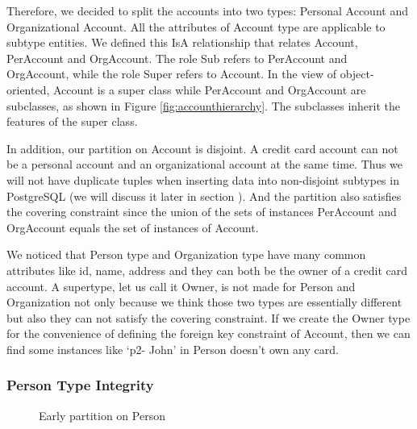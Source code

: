 \documentclass[11pt]{article}
\begin{document}
\par
Therefore, we decided to split the accounts into two types: Personal Account and Organizational Account. All the attributes of Account type are applicable to subtype entities. We defined this IsA relationship that relates Account, PerAccount and OrgAccount. The role Sub refers to PerAccount and OrgAccount, while the role Super refers to Account. In the view of object-oriented, Account is a super class while PerAccount and OrgAccount are subclasses, as shown in Figure \ref{fig:accounthierarchy}. The subclasses inherit the features of the super class.
\par
In addition, our partition on Account is disjoint. A credit card account can not be a personal account and an organizational account at the same time. Thus we will not have duplicate tuples when inserting data into non-disjoint subtypes in PostgreSQL (we will discuss it later in section \label{ref:ptype}). And the partition also satisfies the covering constraint since the union of the sets of instances PerAccount and OrgAccount equals the set of instances of Account.
\par
We noticed that Person type and Organization type have many common attributes like id, name, address and they can both be the owner of a credit card account. A supertype, let us call it Owner, is not made for Person and Organization not only because we think those two types are essentially different but also they can not satisfy the covering constraint. If we create the Owner type for the convenience of defining the foreign key constraint of Account, then we can find some instances like `p2- John' in Person doesn't own any card.
\par


\subsubsection{Person Type Integrity}
\label{sec:ptype}

\begin{figure}
\centering
{}
\caption{Early partition on Person}
\label{fig:personhierarchy}
\end{figure}
\end{document}
